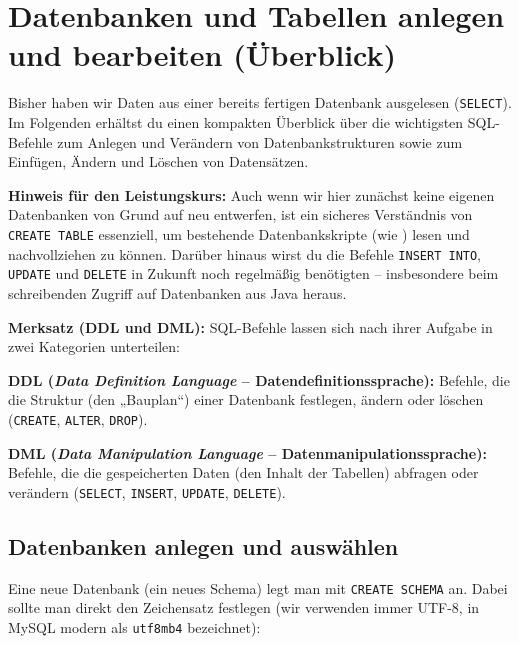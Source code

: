 \section{Datenbanken und Tabellen anlegen und bearbeiten (Überblick)}

Bisher haben wir Daten aus einer bereits fertigen Datenbank ausgelesen
(\lstinline|SELECT|). Im Folgenden erhältst du einen kompakten Überblick über
die wichtigsten SQL-Befehle zum Anlegen und Verändern von Datenbankstrukturen
sowie zum Einfügen, Ändern und Löschen von Datensätzen.

\noindent \textbf{Hinweis für den Leistungskurs:} Auch wenn wir hier zunächst
keine eigenen Datenbanken von Grund auf neu entwerfen, ist ein sicheres
Verständnis von \lstinline|CREATE TABLE| essenziell, um bestehende
Datenbankskripte (wie ) lesen und nachvollziehen zu
können. Darüber hinaus wirst du die Befehle \lstinline|INSERT INTO|,
\lstinline|UPDATE| und \lstinline|DELETE| in Zukunft noch regelmäßig benötigten
-- insbesondere beim schreibenden Zugriff auf Datenbanken aus Java heraus.

\begin{framed}
\textbf{Merksatz (DDL und DML):} SQL-Befehle lassen sich nach ihrer Aufgabe in
zwei Kategorien unterteilen:
\begin{compactitem}
  \item \textbf{DDL (\emph{Data Definition Language} -- Datendefinitionssprache):}
  Befehle, die die Struktur (den „Bauplan“) einer Datenbank festlegen, ändern
  oder löschen (\lstinline|CREATE|, \lstinline|ALTER|, \lstinline|DROP|).
  \item \textbf{DML (\emph{Data Manipulation Language} -- Datenmanipulationssprache):}
  Befehle, die die gespeicherten Daten (den Inhalt der Tabellen) abfragen oder
  verändern (\lstinline|SELECT|, \lstinline|INSERT|, \lstinline|UPDATE|,
  \lstinline|DELETE|).
\end{compactitem}
\end{framed}

\subsection{Datenbanken anlegen und auswählen}

Eine neue Datenbank (ein neues Schema) legt man mit \lstinline|CREATE SCHEMA|
an. Dabei sollte man direkt den Zeichensatz festlegen (wir verwenden immer
UTF-8, in MySQL modern als \lstinline|utf8mb4| bezeichnet):

